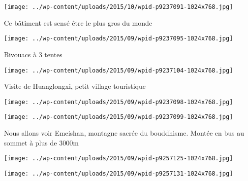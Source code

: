 \begin{center} \texttt{[image: ../wp-content/uploads/2015/10/wpid-p9237091-1024x768.jpg]} \end{center}

 

 Ce bâtiment est sensé être le plus gros du monde 

 

\begin{center} \texttt{[image: ../wp-content/uploads/2015/09/wpid-p9237095-1024x768.jpg]} \end{center}

 

 Bivouacs à 3 tentes 

 

\begin{center} \texttt{[image: ../wp-content/uploads/2015/09/wpid-p9237104-1024x768.jpg]} \end{center}

 

 Visite de Huanglongxi, petit village touristique 

 

\begin{center} \texttt{[image: ../wp-content/uploads/2015/09/wpid-p9237098-1024x768.jpg]} \end{center}

 

 

\begin{center} \texttt{[image: ../wp-content/uploads/2015/09/wpid-p9237099-1024x768.jpg]} \end{center}

 

 Nous allons voir Emeishan, montagne sacrée du bouddhisme. Montée en bus au sommet à plus de 3000m 

 

\begin{center} \texttt{[image: ../wp-content/uploads/2015/09/wpid-p9257125-1024x768.jpg]} \end{center}

 

 

\begin{center} \texttt{[image: ../wp-content/uploads/2015/09/wpid-p9257131-1024x768.jpg]} \end{center}

 

